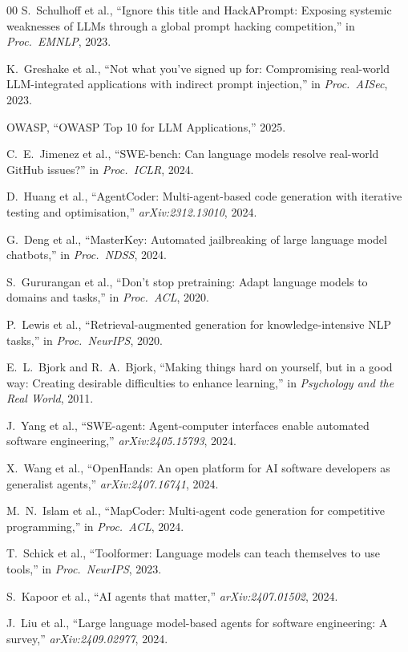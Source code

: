 \documentclass[11pt,a4paper]{article}
\begin{document}
\begin{thebibliography}{00}
S.~Schulhoff et al., ``Ignore this title and HackAPrompt: Exposing systemic weaknesses of LLMs through a global prompt hacking competition,'' in \textit{Proc.\ EMNLP}, 2023.

K.~Greshake et al., ``Not what you've signed up for: Compromising real-world LLM-integrated applications with indirect prompt injection,'' in \textit{Proc.\ AISec}, 2023.

OWASP, ``OWASP Top 10 for LLM Applications,'' 2025.

C.~E.~Jimenez et al., ``SWE-bench: Can language models resolve real-world GitHub issues?'' in \textit{Proc.\ ICLR}, 2024.

D.~Huang et al., ``AgentCoder: Multi-agent-based code generation with iterative testing and optimisation,'' \textit{arXiv:2312.13010}, 2024.

G.~Deng et al., ``MasterKey: Automated jailbreaking of large language model chatbots,'' in \textit{Proc.\ NDSS}, 2024.

S.~Gururangan et al., ``Don't stop pretraining: Adapt language models to domains and tasks,'' in \textit{Proc.\ ACL}, 2020.

P.~Lewis et al., ``Retrieval-augmented generation for knowledge-intensive NLP tasks,'' in \textit{Proc.\ NeurIPS}, 2020.

E.~L.~Bjork and R.~A.~Bjork, ``Making things hard on yourself, but in a good way: Creating desirable difficulties to enhance learning,'' in \textit{Psychology and the Real World}, 2011.

J.~Yang et al., ``SWE-agent: Agent-computer interfaces enable automated software engineering,'' \textit{arXiv:2405.15793}, 2024.

X.~Wang et al., ``OpenHands: An open platform for AI software developers as generalist agents,'' \textit{arXiv:2407.16741}, 2024.

M.~N.~Islam et al., ``MapCoder: Multi-agent code generation for competitive programming,'' in \textit{Proc.\ ACL}, 2024.

T.~Schick et al., ``Toolformer: Language models can teach themselves to use tools,'' in \textit{Proc.\ NeurIPS}, 2023.

S.~Kapoor et al., ``AI agents that matter,'' \textit{arXiv:2407.01502}, 2024.

J.~Liu et al., ``Large language model-based agents for software engineering: A survey,'' \textit{arXiv:2409.02977}, 2024.

\end{thebibliography}
\end{document}
